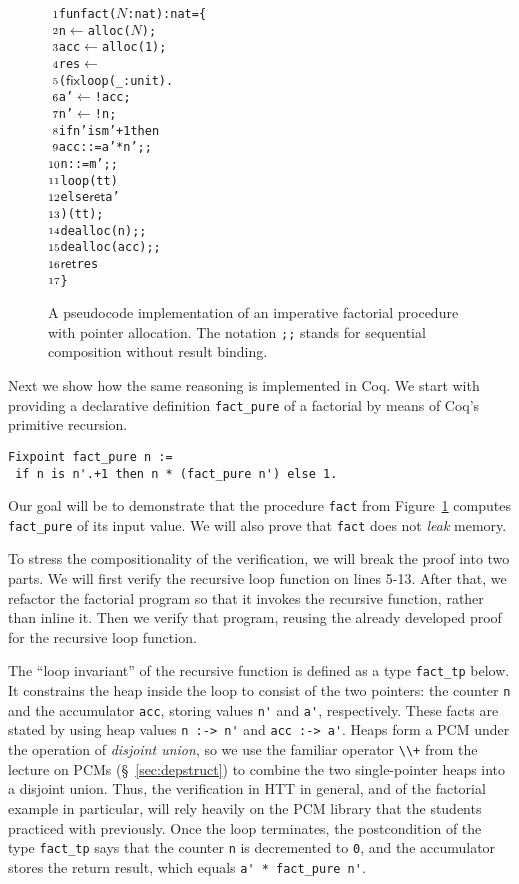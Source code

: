 \documentclass[blockstyle,preprint]{sigplanconf}
\newcommand{\asgn}{\leftarrow}
\newcommand{\code}[1]{\lstinline{#1}}
\newcommand{\var}[1]{\({#1}\)}
\newcommand{\num}[1]{\({\text{{\scriptsize{#1}}}}\)}
\newcommand{\ret}{\mathsf{ret}}
\newcommand{\fix}{\mathsf{fix}}
\begin{document}
\begin{figure}
{\small
\begin{alltt}
\num{ 1}  fun fact (\var{N} : nat) : nat = \{
\num{ 2}      n   \(\asgn\) alloc(\var{N});
\num{ 3}      acc \(\asgn\) alloc(1); 
\num{ 4}      res \(\asgn\) 
\num{ 5}        (\(\fix\) loop (_ : unit). 
\num{ 6}            a' \(\asgn\) !acc;
\num{ 7}            n' \(\asgn\) !n;
\num{ 8}            if n' is m' + 1 then
\num{ 9}               acc ::= a' * n';;
\num{10}               n   ::= m';;
\num{11}               loop(tt) 
\num{12}            else \(\ret\) a'
\num{13}         )(tt);
\num{14}      dealloc(n);;
\num{15}      dealloc(acc);;
\num{16}      \(\ret\) res
\num{17}  \}
\end{alltt}
}
\caption{A pseudocode implementation of an imperative factorial
  procedure with pointer allocation. The notation \texttt{\small{;;}}
  stands for sequential composition without result binding.}
\label{fig:fact}
\end{figure}

Next we show how the same reasoning is implemented in Coq. We start
with providing a declarative definition \code{fact_pure} of a
factorial by means of Coq's primitive recursion.


\begin{lstlisting}
Fixpoint fact_pure n := 
 if n is n'.+1 then n * (fact_pure n') else 1.
\end{lstlisting}
%
Our goal will be to demonstrate that the procedure \code{fact} from
Figure~\ref{fig:fact} computes \code{fact_pure} of its input value. We
will also prove that \code{fact} does not \emph{leak} memory.

To stress the compositionality of the verification, we will break the
proof into two parts. We will first verify the recursive loop function
on lines 5-13. After that, we refactor the factorial program so that
it invokes the recursive function, rather than inline it. Then we
verify that program, reusing the already developed proof for the
recursive loop function.


The ``loop invariant'' of the recursive function is defined as a type
\code{fact_tp} below. It constrains the heap inside the loop to
consist of the two pointers: the counter \code{n} and the accumulator
\code{acc}, storing values \code{n'} and \code{a'}, respectively.
These facts are stated by using heap values \code{n :-> n'} and
\code{acc :-> a'}. Heaps form a PCM under the operation of
\emph{disjoint union}, so we use the familiar operator \code{\\+} from
the lecture on PCMs (\S~\ref{sec:depstruct}) to combine the two
single-pointer heaps into a disjoint union. Thus, the verification in
HTT in general, and of the factorial example in particular, will rely
heavily on the PCM library that the students practiced with
previously. Once the loop terminates, the postcondition of the type
\code{fact_tp} says that the counter \code{n} is decremented to
\code{0}, and the accumulator stores the return result, which equals
\code{a' * fact_pure n'}.
\end{document}
